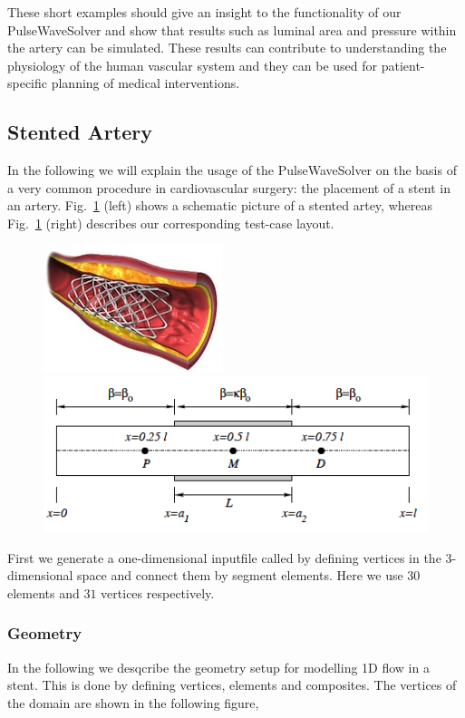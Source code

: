 These short examples should give an insight to the functionality of our
PulseWaveSolver and show that results such as luminal area and pressure within
the artery can be simulated. These results can contribute to understanding the
physiology of the human vascular system and they can be used for
patient-specific planning of medical interventions.



\subsection{Stented Artery}
In the following we will explain the usage of the PulseWaveSolver on the basis
of a very common procedure in cardiovascular surgery: the placement of a stent
in an artery. Fig.~\ref{f:pulsewave:stent} (left) shows a schematic picture of a
stented artey, whereas Fig.~\ref{f:pulsewave:stent} (right) describes our
corresponding test-case layout.
\begin{figure}
	\includegraphics[width=0.35\linewidth]{Figures/stent_2.jpg}
	\includegraphics[width=0.6\linewidth]{Figures/P_M_D.png}
	\caption{}
	\label{f:pulsewave:stent}
\end{figure}
First we generate a one-dimensional inputfile called  by
defining vertices in the 3-dimensional space and connect them by segment elements. Here
we use $30$ elements and $31$ vertices respectively.

\subsubsection{Geometry}
In the following we desqcribe the geometry setup for modelling 1D flow in a
stent. This is done by defining vertices, elements and composites. The vertices
of the domain are shown in the following figure,

